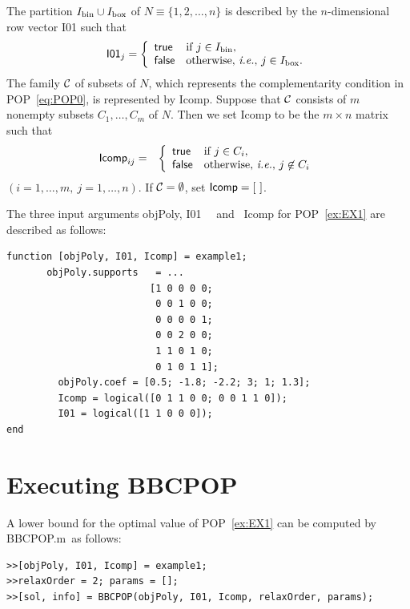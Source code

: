 \documentclass[12pt]{article}
\def\CC{\mbox{$\cal C$}}
\def\Ibinary{\mbox{$I_{\mbox{\scriptsize bin}}$}}
\def\Ibox{\mbox{$I_{\mbox{\scriptsize box}}$}}
\def\matBP{BBCPOP}
\begin{document}
The partition $\Ibinary\cup\Ibox$ of $N\equiv\{1,2,\ldots,n\}$ is described by the $n$-dimensional 
row vector  {\sf I01} such that 
\begin{eqnarray*}
 {\sf I01}_j = \left\{ \begin{array}{ll}
{\sf true}  & \mbox{if } j \in \Ibinary, \\ 
{\sf false} & \mbox{otherwise, {\it i.e.},  }  j \in \Ibox. 
\end{array} \right. 
\end{eqnarray*}
The family $\CC$ of subsets of $N$, which represents the complementarity condition in POP~\eqref{eq:POP0}, 
is represented by  {\sf Icomp}. Suppose that $\CC$ consists of $m$ nonempty subsets $C_1,\ldots,C_m$ of $N$. 
Then we set {\sf Icomp} to be the $m \times n$ matrix such that 
\begin{eqnarray*}
{\sf Icomp}_{ij} & = &
 \left\{ \begin{array}{ll}
{\sf true} & \mbox{if } j \in C_i, \\ 
{\sf false} & \mbox{otherwise, {\it i.e.},  }  j \not\in C_i
\end{array} \right. 
\end{eqnarray*}
$(i=1,\ldots,m, \ j=1,\ldots,n)$. If $\CC = \emptyset$, set ${\sf Icomp} = [\ ]$. 

The three input arguments {\sf objPoly},  {\sf I01} \ \mbox{ and } {\sf Icomp} for POP~\eqref{ex:EX1} 
are described as follows:
\begin{verbatim}
function [objPoly, I01, Icomp] = example1;
       objPoly.supports   = ...
                         [1 0 0 0 0;
                          0 0 1 0 0;
                          0 0 0 0 1;
                          0 0 2 0 0;
                          1 1 0 1 0;
                          0 1 0 1 1];
         objPoly.coef = [0.5; -1.8; -2.2; 3; 1; 1.3];	 
         Icomp = logical([0 1 1 0 0; 0 0 1 1 0]);
         I01 = logical([1 1 0 0 0]);
end 
\end{verbatim}

\section{Executing \matBP}

\label{sample}

A lower bound for the optimal value of POP~\eqref{ex:EX1} can be computed by \matBP.m\ as follows:
\begin{verbatim}
>>[objPoly, I01, Icomp] = example1;
>>relaxOrder = 2; params = [];
>>[sol, info] = BBCPOP(objPoly, I01, Icomp, relaxOrder, params);
\end{verbatim}
\end{document}
